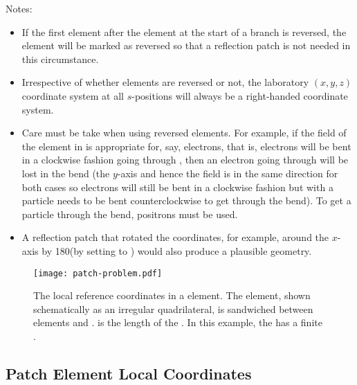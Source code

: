Notes:
\begin{itemize}
\item
If the first element after the  element at the start of a branch is reversed, the
 element will be marked as reversed so that a reflection patch is not needed in
this circumstance.
\item
Irrespective of whether elements are reversed or not, the laboratory $(x,y,z)$ coordinate system
at all $s$-positions will always be a right-handed coordinate system.
\item
Care must be take when using reversed elements. For example, if the field of the  element in
 is appropriate for, say, electrons, that is, electrons will be bent in a clockwise
fashion going through , then an electron going through  will be lost in the bend
(the $y$-axis and hence the field is in the same direction for both cases so electrons will still be
bent in a clockwise fashion but with  a particle needs to be bent counterclockwise to get
through the bend). To get a particle through the bend, positrons must be used.
\item
A reflection patch that rotated the coordinates, for example, around the $x$-axis by 180\Deg (by
setting  to ) would also produce a plausible geometry.
\end{itemize}


\begin{figure}[bt]
  \centering
  \texttt{[image: patch-problem.pdf]}
  \caption[The local reference coordinates in a  element.]
{The local reference coordinates in a  element. The  element, shown
schematically as an irregular quadrilateral, is sandwiched between elements  and
.  is the length of the . In this example, the  has a finite
.}
  \label{f:patch.prob}
\end{figure}

\subsection{Patch Element Local Coordinates}
\label{s:patch.prob}

